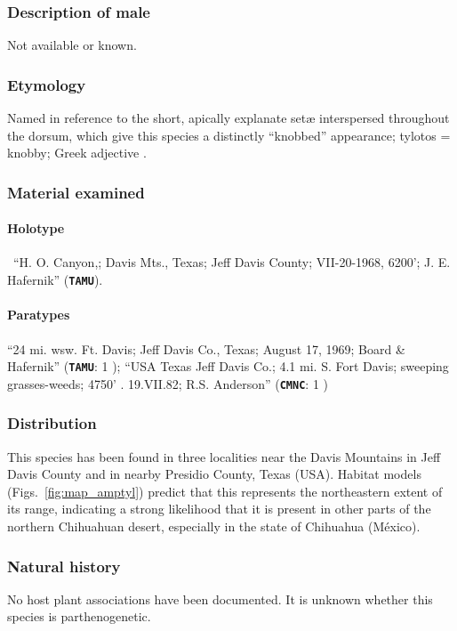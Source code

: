 \documentclass[fleqn,10pt,lineno]{wlpeerj} %
\begin{document}
		\subsubsection*{Description of male}
			Not available or known.
		\subsubsection*{Etymology}
			Named in reference to the short, apically explanate set{\ae} interspersed throughout the dorsum, which give this species a distinctly ``knobbed'' appearance; tylotos = knobby; Greek adjective \citep{brown1956}.
		\subsubsection*{Material examined}
			\paragraph{Holotype}
				\female~``H. O. Canyon,; Davis Mts., Texas; Jeff Davis County; VII-20-1968, 6200'; J. E. Hafernik'' (\texttt{\textbf{TAMU}}).
			\paragraph{Paratypes}
				``24 mi. wsw. Ft. Davis; Jeff Davis Co., Texas; August 17, 1969; Board \& Hafernik'' (\texttt{\textbf{TAMU}}: 1 \female);
				``USA Texas Jeff Davis Co.; 4.1 mi. S. Fort Davis; sweeping grasses-weeds; 4750' . 19.VII.82; R.S. Anderson'' (\texttt{\textbf{CMNC}}: 1 \female)
		\subsubsection*{Distribution}
			This species has been found in three localities near the Davis Mountains in Jeff Davis County and in nearby Presidio County, Texas (USA).
			Habitat models (Figs.~\ref{fig:map_amptyl}) predict that this represents the northeastern extent of its range, indicating a strong likelihood that it is present in other parts of the northern Chihuahuan desert, especially in the state of Chihuahua (M\'{e}xico).
		\subsubsection*{Natural history}
			No host plant associations have been documented.
			It is unknown whether this species is parthenogenetic.
			
\end{document}
